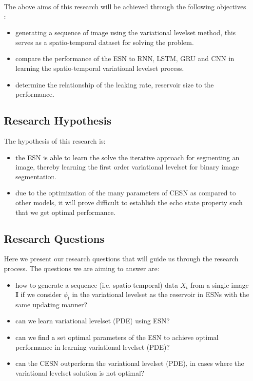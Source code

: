 \documentclass{WitsPhysicsReport}
\begin{document}
The above aims of this research will be achieved through the following objectives :
\begin{itemize}
    \item generating a sequence of image using the variational levelset method, this serves as a spatio-temporal dataset for solving the problem.
    \item compare the performance of the ESN to RNN, LSTM, GRU and CNN in learning the spatio-temporal variational levelset process.
    \item determine the relationship of the leaking rate, reservoir size to the performance. 
\end{itemize}


\subsection{Research Hypothesis}
\label{sec:research_hypothesis}
The hypothesis of this research is:
\begin{itemize}
    \item the ESN is able to learn the solve the iterative approach for segmenting an image, thereby learning the first order variational levelset for binary image segmentation.
    \item due to the optimization of the many parameters of CESN  as compared to other models, it will prove difficult to establish the echo state property such that we get optimal performance.
\end{itemize}




\subsection{Research Questions}
\label{sec:research_questions}
Here we present our research questions that will guide us through the research process. The questions we are aiming to answer are:
\begin{itemize}
    \item how to generate a sequence (i.e. spatio-temporal) data $X_{t}$ from a single image $\mathbf{I}$ if we consider $\phi_{t}$ in the variational levelset  as the reservoir in ESNs with the same updating manner?
    \item can we learn variational levelset (PDE) using ESN? 
    \item can we find a set optimal parameters of the ESN to achieve optimal performance in learning variational levelset (PDE)? 
    \item can the CESN outperform the  variational levelset (PDE), in cases where the  variational levelset solution is not optimal?
\end{itemize}
\end{document}
